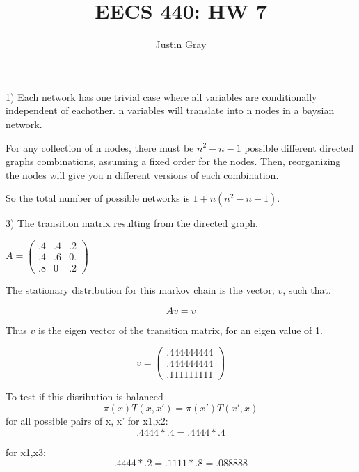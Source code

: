 \documentclass[12pt]{article}
\title{EECS 440: HW 7}
\author{Justin Gray}
\begin{document}
\maketitle
\setcounter{equation}{0}
1) Each network has one trivial case where all variables are conditionally 
independent of eachother. n variables will translate into n nodes in a baysian 
network. 

For any collection of n nodes, there must be $n^2-n-1$ possible different
directed graphs combinations, assuming a fixed order for the nodes. Then, 
reorganizing the nodes will give you n different versions of each combination. 

So the total number of possible networks is $1+ n(n^2-n-1)$. 

\pagebreak
\setcounter{equation}{0}
3) The transition matrix resulting from the directed graph. 

$
A = \left( \begin{array}{ccc}
.4 & .4 & .2 \\
.4 & .6 & 0. \\
.8 & 0  & .2 \end{array} \right) 
$

The stationary distribution for this markov chain is the vector, $v$, such that. 

\begin{equation}
   Av = v
\end{equation}

Thus $v$ is the eigen vector of the transition matrix, for an eigen value of 1. 

\begin{equation}
    v = \left(\begin{array}{c}
    .444444444 \\
    .444444444 \\
    .111111111 \end{array} \right)
\end{equation}

To test if this disribution is balanced
\begin{equation}
     \pi(x)T(x,x') = \pi(x')T(x',x)
\end{equation}
for all possible pairs of x, x'
for x1,x2: 
\begin{equation}
     .4444*.4 = .4444*.4
\end{equation}

for x1,x3: 
\begin{equation}
     .4444*.2 = .1111*.8 = .088888
\end{equation}
\end{document}
